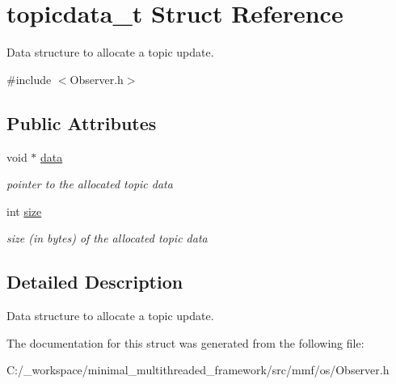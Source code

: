 \hypertarget{structtopicdata__t}{\section{topicdata\-\_\-t Struct Reference}
\label{structtopicdata__t}
}


Data structure to allocate a topic update.  




{\ttfamily \#include $<$Observer.\-h$>$}

\subsection*{Public Attributes}
\begin{DoxyCompactItemize}
\item 
\hypertarget{structtopicdata__t_af3aa20790408cfec38f28df96cd1670d}{void $\ast$ \hyperlink{structtopicdata__t_af3aa20790408cfec38f28df96cd1670d}{data}}\label{structtopicdata__t_af3aa20790408cfec38f28df96cd1670d}

\begin{DoxyCompactList}\small\item\em pointer to the allocated topic data \end{DoxyCompactList}\item 
\hypertarget{structtopicdata__t_aaf2382a800d0b00948de619e51aafb21}{int \hyperlink{structtopicdata__t_aaf2382a800d0b00948de619e51aafb21}{size}}\label{structtopicdata__t_aaf2382a800d0b00948de619e51aafb21}

\begin{DoxyCompactList}\small\item\em size (in bytes) of the allocated topic data \end{DoxyCompactList}\end{DoxyCompactItemize}


\subsection{Detailed Description}
Data structure to allocate a topic update. 

The documentation for this struct was generated from the following file\-:\begin{DoxyCompactItemize}
\item 
C\-:/\-\_\-workspace/minimal\-\_\-multithreaded\-\_\-framework/src/mmf/os/Observer.\-h\end{DoxyCompactItemize}
